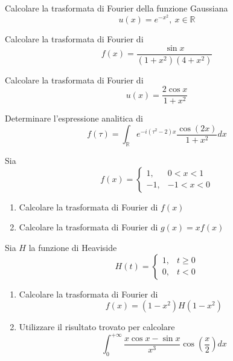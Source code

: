 Calcolare la trasformata di Fourier della funzione Gaussiana
\begin{equation*}
u( x) =e^{-x^{2}} ,\ x\in \mathbb{R}
\end{equation*}
\Esercizio{}

Calcolare la trasformata di Fourier di
\begin{equation*}
f( x) =\frac{\sin x}{\left( 1+x^{2}\right)\left( 4+x^{2}\right)}
\end{equation*}
\Esercizio{}

Calcolare la trasformata di Fourier di\begin{equation*}
u( x) =\frac{2\cos x}{1+x^{2}}
\end{equation*}
\Esercizio{}

Determinare l'espressione analitica di
\begin{equation*}
f( \tau ) =\int _{\mathbb{R}} e^{-i\left( \tau ^{2} -2\right) x}\frac{\cos( 2x)}{1+x^{2}} dx
\end{equation*}
\Esercizio{}

Sia
\begin{equation*}
f( x) =\begin{cases}
1, & 0< x< 1\\
-1, & -1< x< 0
\end{cases}
\end{equation*}
\begin{enumerate}
\item Calcolare la trasformata di Fourier di $f( x)$
\item Calcolare la trasformata di Fourier di $g( x) =xf( x)$
\end{enumerate}
\Esercizio{}

Sia $H$ la funzione di Heaviside
\begin{equation*}
H( t) =\begin{cases}
1, & t\geqslant 0\\
0, & t< 0
\end{cases}
\end{equation*}
\begin{enumerate}
\item Calcolare la trasformata di Fourier di\begin{equation*}
f( x) =\left( 1-x^{2}\right) H\left( 1-x^{2}\right)
\end{equation*}
\item Utilizzare il risultato trovato per calcolare\begin{equation*}
\int ^{+\infty }_{0}\frac{x\cos x-\sin x}{x^{3}}\cos\left(\frac{x}{2}\right) dx
\end{equation*}
\end{enumerate}
\ParteSoluzioni
\Soluzione

